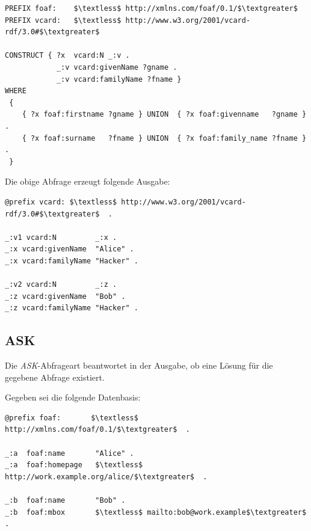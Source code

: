 \begin{lstlisting}
PREFIX foaf:    $\textless$ http://xmlns.com/foaf/0.1/$\textgreater$ 
PREFIX vcard:   $\textless$ http://www.w3.org/2001/vcard-rdf/3.0#$\textgreater$ 

CONSTRUCT { ?x  vcard:N _:v .
            _:v vcard:givenName ?gname .
            _:v vcard:familyName ?fname }
WHERE
 {
    { ?x foaf:firstname ?gname } UNION  { ?x foaf:givenname   ?gname } .
    { ?x foaf:surname   ?fname } UNION  { ?x foaf:family_name ?fname } .
 }
\end{lstlisting}

Die obige Abfrage erzeugt folgende Ausgabe:
\begin{lstlisting}
@prefix vcard: $\textless$ http://www.w3.org/2001/vcard-rdf/3.0#$\textgreater$  .

_:v1 vcard:N         _:x .
_:x vcard:givenName  "Alice" .
_:x vcard:familyName "Hacker" .

_:v2 vcard:N         _:z .
_:z vcard:givenName  "Bob" .
_:z vcard:familyName "Hacker" .
\end{lstlisting}

\subsection{ASK}
\label{subsec:sparql_abfragearten_ask}
Die \textit{ASK}-Abfrageart beantwortet in der Ausgabe, ob eine Lösung für die gegebene Abfrage existiert.

Gegeben sei die folgende Datenbasis:
\lstset{language=XML}
\begin{lstlisting}
@prefix foaf:       $\textless$ http://xmlns.com/foaf/0.1/$\textgreater$  .

_:a  foaf:name       "Alice" .
_:a  foaf:homepage   $\textless$ http://work.example.org/alice/$\textgreater$  .

_:b  foaf:name       "Bob" .
_:b  foaf:mbox       $\textless$ mailto:bob@work.example$\textgreater$  .
\end{lstlisting}

